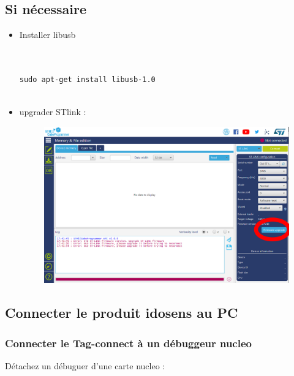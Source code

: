 \documentclass{article}
\begin{document}
\subsection{Si nécessaire}

\begin{itemize}
    



\item Installer libusb

\begin{verbatim}


sudo apt-get install libusb-1.0


\end{verbatim}

\item  upgrader STlink :

\begin{figure}[H]
\begin{center}
\advance\leftskip-3cm
\advance\rightskip-3cm
\includegraphics[keepaspectratio=true,scale=0.3]{stlink_upgrade.png}
\label{visina8}
\end{center}\end{figure}



\end{itemize}


\subsection{Connecter le produit idosens au PC}

\subsubsection{Connecter le Tag-connect à un débuggeur nucleo}
Détachez un débuguer d'une carte nucleo :
\end{document}
